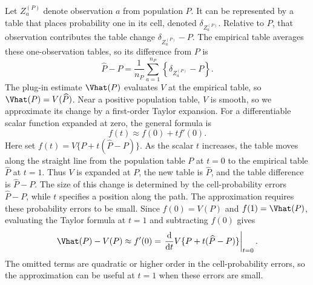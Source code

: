 Let \(Z_a^{(P)}\) denote observation \(a\) from population \(P\). It can
be represented by a table that places probability one in its cell,
denoted \(\delta_{Z_a^{(P)}}\). Relative to
\(P\), that observation contributes the table change
\(\delta_{Z_a^{(P)}}-P\). The empirical table averages these one-observation
tables, so its difference from \(P\) is
\begin{equation}
  \widehat P-P
  =\frac{1}{n_P}\sum_{a=1}^{n_P}
  \left\{\delta_{Z_a^{(P)}}-P\right\}.
\end{equation}
The plug-in estimate \(\Vhat(P)\) evaluates \(V\) at the empirical table,
so \(\Vhat(P)=V(\widehat P)\). Near a positive population table, \(V\)
is smooth, so we approximate its change by a first-order Taylor
expansion. For a differentiable scalar function
expanded at zero, the general formula is
\begin{equation*}
  f(t)\approx f(0)+t f'(0).
\end{equation*}
Here set \(f(t)=V\{P+t(\widehat P-P)\}\). As the scalar \(t\) increases,
the table moves along the straight line from the population table \(P\) at
\(t=0\) to the empirical table \(\widehat P\) at \(t=1\). Thus \(V\) is expanded at \(P\), the
new table is \(\widehat P\), and the table difference is
\(\widehat P-P\). The size of this change is determined by the
cell-probability errors \(\widehat P-P\), while \(t\) specifies a
position along the path. The approximation requires these probability
errors to be small. Since \(f(0)=V(P)\) and \(f(1)=\Vhat(P)\), evaluating
the Taylor formula at \(t=1\) and subtracting \(f(0)\) gives
\begin{equation*}
  \Vhat(P)-V(P)
  \approx f'(0)
  =\left.\frac{\mathrm d}{\mathrm dt}
    V\{P+t(\widehat P-P)\}\right|_{t=0}.
\end{equation*}
The omitted terms are quadratic or higher order in the cell-probability
errors, so the approximation can be useful at \(t=1\) when these errors
are small.

